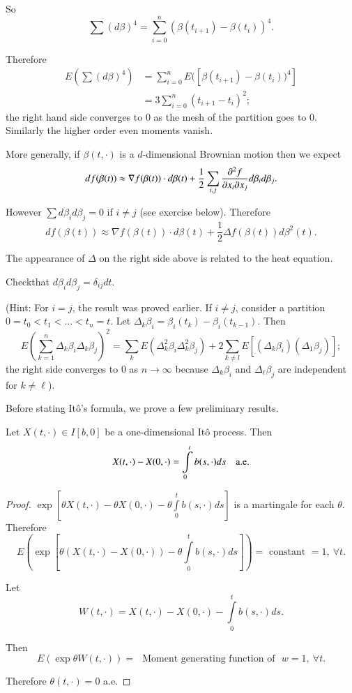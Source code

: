 So
$$
\sum(d\beta)^{4}=\sum^{n}_{i=0}(\beta(t_{i+1})-\beta(t_{i}))^{4}.
$$

Therefore
\begin{align*}
E(\sum(d\beta)^{4}) &=
\sum^{n}_{i=0}E([\beta(t_{i+1})-\beta(t_{i}))^{4}]\\
&= 3\sum^{n}_{i=0}(t_{i+1}-t_{i})^{2};
\end{align*}
the right hand side converges to $0$ as the mesh of the partition goes
to $0$. Similarly the higher order even moments vanish.

More generally, if $\beta(t,\cdot)$ is a $d$-dimensional Brownian
motion then we expect
$$
df(\beta(t))\approx \nabla f(\beta(t))\cdot
d\beta(t)+\frac{1}{2}\sum_{i,j}\frac{\partial^{2}f}{\partial x_{i}\partial
  x_{j}}d\beta_{i}d\beta_{j}.
$$

However $\sum d\beta_{i}d\beta_{j}=0$ if $i\neq j$ (see exercise
below). Therefore 
$$
df(\beta(t))\approx \nabla f(\beta(t))\cdot
d\beta(t)+\frac{1}{2}\Delta f(\beta(t))d\beta^{2}(t).
$$

The appearance of $\Delta$ on the right side above is related to the
heat equation.

\setcounter{exercise}{3}
\begin{exercise}\label{chap16-exer4}
Check\pageoriginale that $d\beta_{i}d\beta_{j}=\delta_{ij}dt$.

\noindent
(Hint: For $i=j$, the result was proved earlier. If $i\neq j$,
consider a partition $0=t_{0}<t_{1}<\ldots<t_{n}=t$. Let
$\Delta_{k}\beta_{i}=\beta_{i}(t_{k})-\beta_{i}(t_{k-1})$. Then
$$
E\left(\sum\limits^{n}_{k=1}\Delta_{k}\beta_{i}\Delta_{k}\beta_{j}\right)^{2}=\sum_{k}E(\Delta^{2}_{k}\beta_{i}\Delta^{2}_{k}\beta_{j})+2\sum\limits_{k\neq
  l}E[(\Delta_{k}\beta_{i})(\Delta_{1}\beta_{j})]; 
$$
the right side converges to $0$ as $n\to \infty$ because
$\Delta_{k}\beta_{i}$ and $\Delta_{\ell}\beta_{j}$ are independent for
$k\neq \ell$).

Before stating It\^o's formula, we prove a few preliminary results.
\end{exercise}

\setcounter{lemma}{0}
\begin{lemma}\label{chap16-lem1}
Let $X(t,\cdot)\in I[b,0]$ be a one-dimensional It\^o process. Then
$$
X(t,\cdot)-X(0,\cdot)=\int\limits^{t}_{0}b(s,\cdot)ds\quad \text{a.e.}
$$
\end{lemma}

\begin{proof}
$\exp[\theta X(t,\cdot)-\theta
    X(0,\cdot)-\theta\int\limits^{t}_{0}b(s,\cdot)ds]$ is a martingale
  for each $\theta$. Therefore
$$
E(\exp[\theta(X(t,\cdot)-X(0,\cdot))-\theta\int\limits^{t}_{0}b(s,\cdot)ds])=\text{~constant~}=1,\ \forall t.
$$

Let 
$$
W(t,\cdot)=X(t,\cdot)-X(0,\cdot)-\int\limits^{t}_{0}b(s,\cdot)ds.
$$

Then 
$$
E(\exp \theta W(t,\cdot))=\text{~ Moment generating function of~ }
w=1,\ \forall t.
$$

Therefore $\theta(t,\cdot)=0$ a.e.
\end{proof}

